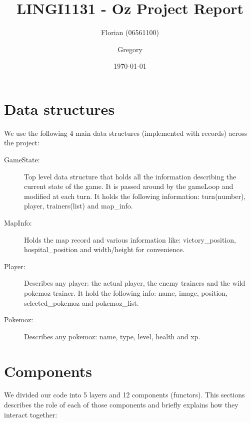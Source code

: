 \documentclass[10pt, a4paper]{article}
\author{Florian \bsc{Thuin} (06561100) \and Gregory \bsc{Vander Schueren}}
\title{LINGI1131 - Oz Project Report}
\date{\today}
\begin{document}
\maketitle

\section{Data structures}

We use the following 4 main data structures (implemented with records) across the project:

\begin{description}
  \item [GameState:] Top level data structure that holds all the information describing the current state of the game. It is passed around by the gameLoop and modified at each turn. It holds the following information: turn(number), player, trainers(list) and map\_info.
  \item [MapInfo:] Holds the map record and various information like: victory\_position, hospital\_position and width/height for convenience.
  \item [Player:] Describes any player: the actual player, the enemy trainers and the \og{}wild pokemoz\fg{} trainer. It hold the following info: name, image, position, selected\_pokemoz and pokemoz\_list.
  \item [Pokemoz:] Describes any pokemoz: name, type, level, health and xp.

\end{description}

\section{Components}

We divided our code into 5 layers and 12 \og{}components\fg{} (functors). This sections describes the role of each of those components and briefly explains how they interact together:
\end{document}
